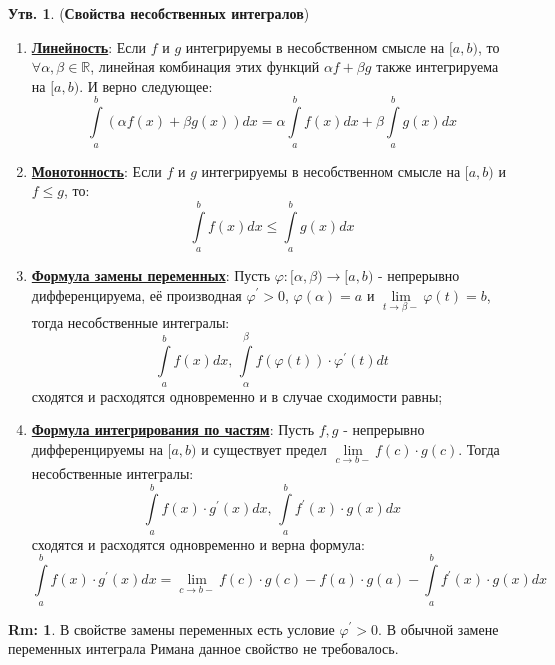 \documentclass[12pt]{article}
\newcommand{\MR}{\mathbb{R}}
\theoremstyle{definition}
\newtheorem{rem}{Rm:}
\newtheorem{prop}{Утв.}
\newcommand{\ddint}[2]{\displaystyle\int\limits_{#1}^{#2}}
\begin{document}
\begin{prop}(\textbf{Свойства несобственных интегралов})
	\begin{enumerate}[label ={(\arabic*)}]
		\item \uline{\textbf{{Линейность}}}: Если $f$ и $g$ интегрируемы в несобственном смысле на $[a,b)$, то $\forall \alpha, \beta \in \MR$, линейная комбинация этих функций $\alpha f + \beta g$ также интегрируема на $[a,b)$. И верно следующее:
		$$
			\ddint{a}{b}\left(\alpha f(x) + \beta g(x)\right)dx = \alpha \ddint{a}{b}f(x)dx + \beta\ddint{a}{b}g(x) dx
		$$
		\item \uline{\textbf{{Монотонность}}}:  Если $f$ и $g$ интегрируемы в несобственном смысле на $[a,b)$ и $f \leq g$, то:
		$$
			\ddint{a}{b}f(x)dx \leq \ddint{a}{b}g(x)dx
		$$
		
		\item \uline{\textbf{{Формула замены переменных}}}: Пусть $\varphi \colon [\alpha,\beta) \to [a,b)$ - непрерывно дифференцируема, её производная $\varphi^\prime > 0$, $\varphi(\alpha) = a$ и $\lim\limits_{t \to \beta-} \varphi(t) = b$, тогда несобственные интегралы:
		$$
			\ddint{a}{b} f(x)dx, \, \ddint{\alpha}{\beta}f\left(\varphi(t)\right){\cdot}\varphi^\prime(t)dt 
		$$
		сходятся и расходятся одновременно и в случае сходимости равны;
		
		\item \uline{\textbf{Формула интегрирования по частям}}: Пусть $f, g$ - непрерывно дифференцируемы на $[a,b)$ и существует предел $\lim\limits_{c \to b-} f(c){\cdot}g(c)$. Тогда несобственные интегралы:
		$$
			\ddint{a}{b}f(x){\cdot}g^\prime(x)dx, \, \ddint{a}{b}f^\prime(x){\cdot}g(x)dx
		$$  
		сходятся и расходятся одновременно и верна формула:
		$$
			\ddint{a}{b} f(x){\cdot}g^\prime(x)dx = \lim\limits_{c \to b-}f(c){\cdot}g(c) - f(a){\cdot}g(a) - \ddint{a}{b}f^\prime(x){\cdot}g(x)dx
		$$
	\end{enumerate}
\end{prop}
\begin{rem}
	В свойстве замены переменных есть условие $\varphi^\prime > 0$. В обычной замене переменных интеграла Римана данное свойство не требовалось.
\end{rem}
\end{document}
